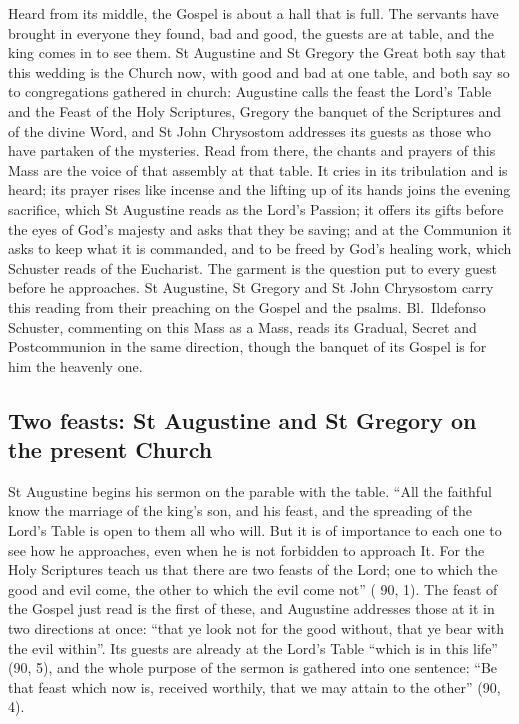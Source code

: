 \label{sec:feast-that-now-is}

Heard from its middle, the Gospel is about a hall that is full. The servants
have brought in everyone they found, bad and good, the guests are at table, and
the king comes in to see them. St Augustine and St Gregory the Great both say
that this wedding is the Church now, with good and bad at one table, and both
say so to congregations gathered in church: Augustine calls the feast the
Lord's Table and the Feast of the Holy Scriptures, Gregory the banquet of the
Scriptures and of the divine Word, and St John Chrysostom addresses its guests
as those who have partaken of the mysteries. Read from there, the chants and
prayers of this Mass are the voice of that assembly at that table. It cries in
its tribulation and is heard; its prayer rises like incense and the lifting up
of its hands joins the evening sacrifice, which St Augustine reads as the
Lord's Passion; it offers its gifts before the eyes of God's majesty and asks
that they be saving; and at the Communion it asks to keep what it is
commanded, and to be freed by God's healing work, which Schuster reads of the
Eucharist. The garment is
the question put to every guest before he approaches. St Augustine, St Gregory
and St John Chrysostom carry this reading from their preaching on the Gospel
and the psalms. Bl.\ Ildefonso Schuster, commenting on this Mass as a Mass,
reads its Gradual, Secret and Postcommunion in the same direction, though the
banquet of its Gospel is for him the heavenly one.

\subsection{Two feasts: St Augustine and St Gregory on the present Church}

St Augustine begins his sermon on the parable with the table. ``All the
faithful know the marriage of the king's son, and his feast, and the spreading
of the Lord's Table is open to them all who will. But it is of importance to
each one to see how he approaches, even when he is not forbidden to approach
It. For the Holy Scriptures teach us that there are two feasts of the Lord; one
to which the good and evil come, the other to which the evil come not''
( 90, 1). The feast of the Gospel just read is the first of these,
and Augustine addresses those at it in two directions at once: ``that ye look
not for the good without, that ye bear with the evil within''. Its guests are
already at the Lord's Table ``which is in this life'' (90, 5), and the whole
purpose of the sermon is gathered into one sentence: ``Be that feast which now
is, received worthily, that we may attain to the other'' (90, 4).


